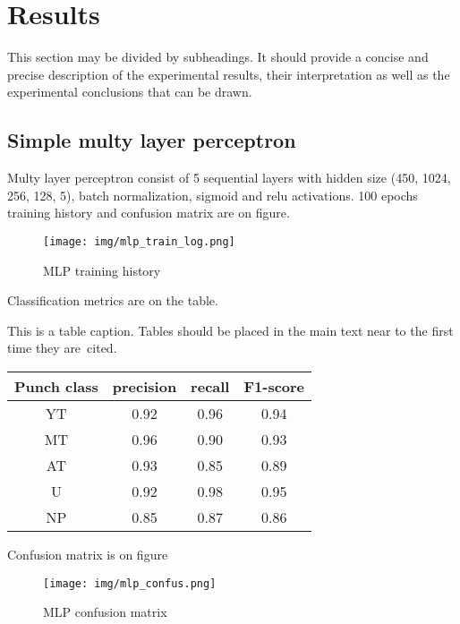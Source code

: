 \documentclass[sport,article,submit,moreauthors,pdftex]{Definitions/mdpi}
\begin{document}
\section{Results}

This section may be divided by subheadings. It should provide a concise and precise description of the experimental results, their interpretation as well as the experimental conclusions that can be drawn.


\subsection{Simple multy layer perceptron}
Multy layer perceptron consist of 5 sequential layers with hidden size (450, 1024, 256, 128, 5), batch normalization, sigmoid and relu activations.
100 epochs training history and confusion matrix are on figure.



\begin{figure}[H]
\texttt{[image: img/mlp\_train\_log.png]}
\caption{MLP training history}
\end{figure} 


Classification metrics are on the table.

\begin{specialtable}[H] 
\caption{This is a table caption. Tables should be placed in the main text near to the first time they are~cited.\label{tab1}}

\begin{tabular}{cccc}
\toprule
\textbf{Punch class}	& \textbf{precision}	& \textbf{recall}	& \textbf{F1-score}\\
\midrule
YT		& 0.92		& 0.96		& 0.94\\
MT		& 0.96		& 0.90		& 0.93\\
AT		& 0.93		& 0.85		& 0.89\\
U		& 0.92		& 0.98		& 0.95\\
NP		& 0.85		& 0.87		& 0.86\\
\bottomrule
\end{tabular}
\end{specialtable}

Confusion matrix is on figure

\begin{figure}[H]
\texttt{[image: img/mlp\_confus.png]}
\caption{MLP confusion matrix}
\end{figure} 
\end{document}

